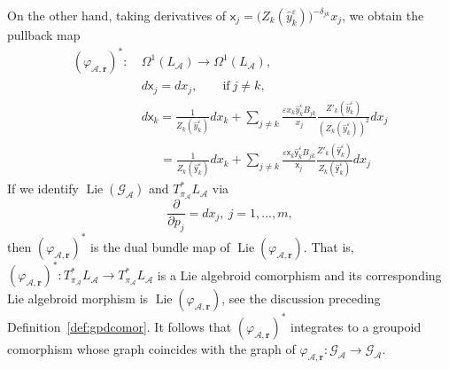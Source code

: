 \documentclass{amsart}
\numberwithin{equation}{section}
\newcommand{\bfr}{{\boldsymbol{r}}}
\newcommand{\sfx}{{\mathsf{x}}}
\newcommand{\sfy}{{\mathsf{y}}}
\newcommand{\cA}{\mathcal{A}}
\newcommand{\cG}{\mathcal{G}}
\newcommand{\Lie}{\operatorname{Lie}}
\begin{document}
On the other hand, taking derivatives of $\sfx_j = \big(Z_k(\hat{y}_k^\varepsilon)\big)^{-\delta_{jk}}x_j$,
we obtain the pullback map
\begin{align*}
	(\varphi_{\cA,\bfr})^*: ~& \Omega^1(L_\cA) \to \Omega^1(L_\cA), \\
	& d \sfx_j = dx_j, \qquad \text{if}~j\ne k, \\
	& d \sfx_k = \frac{1}{Z_k(\hat{y}_k^\varepsilon)} dx_k + \sum\limits_{j\ne k} \frac{\varepsilon x_k \hat{y}_k^\varepsilon B_{jk}}{x_j} \frac{Z'_k(\hat{y}_k^\varepsilon)}{\left(Z_k(\hat{y}_k^\varepsilon)\right)^2} dx_j \\
	& \quad \; \, = \frac{1}{Z_k(\hat{\sfy}_k^\varepsilon)} dx_k + \sum\limits_{j\ne k} \frac{\varepsilon \sfx_k \hat{\sfy}_k^\varepsilon B_{jk}}{\sfx_j} \frac{Z'_k(\hat{\sfy}_k^\varepsilon)}{Z_k(\hat{\sfy}_k^\varepsilon)} dx_j
\end{align*}
If we identify $\Lie \left(\cG_\cA \right)$ and $T^*_{\pi_\cA} L_\cA$ via
\[
	\frac{\partial}{\partial p_j} = dx_j, \> j =1, \ldots, m,
\]
then $(\varphi_{\cA,\bfr})^*$ is the dual bundle map of $\Lie \left(\varphi_{\cA,\bfr} \right)$.
That is, $(\varphi_{\cA,\bfr})^*: T^*_{\pi_\cA} L_\cA \to T^*_{\pi_\cA} L_\cA$ is a Lie algebroid comorphism and its corresponding Lie algebroid morphism is $\Lie \left(\varphi_{\cA,\bfr} \right)$, see the discussion preceding Definition~\ref{def:gpdcomor}.
It follows that $(\varphi_{\cA,\bfr})^*$ integrates to a groupoid comorphism whose graph coincides with the graph of $\varphi_{\cA,\bfr}: \cG_\cA \to \cG_\cA$.
\end{document}

